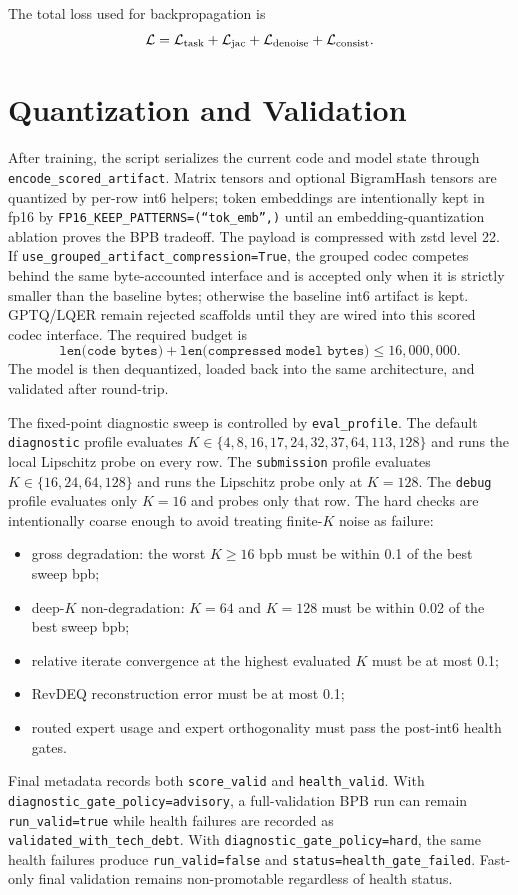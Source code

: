 \documentclass[11pt]{article}
\begin{document}
The total loss used for backpropagation is
\[
  \mathcal{L}
    = \mathcal{L}_{\rm task}
    + \mathcal{L}_{\rm jac}
    + \mathcal{L}_{\rm denoise}
    + \mathcal{L}_{\rm consist}.
\]

\section{Quantization and Validation}
\label{sec:validation}

After training, the script serializes the current code and model state through
\texttt{encode\_scored\_artifact}.  Matrix tensors and optional BigramHash
tensors are quantized by per-row int6 helpers; token embeddings are
intentionally kept in fp16 by
\texttt{FP16\_KEEP\_PATTERNS=(\textquotedblleft tok\_emb\textquotedblright,)}
until an embedding-quantization ablation proves the BPB tradeoff.  The payload
is compressed with zstd level 22.  If
\texttt{use\_grouped\_artifact\_compression=True}, the grouped codec competes
behind the same byte-accounted interface and is accepted only when it is
strictly smaller than the baseline bytes; otherwise the baseline int6 artifact
is kept.  GPTQ/LQER remain rejected scaffolds until they are wired into this
scored codec interface.  The required budget is
\[
  \texttt{len(code bytes)}+\texttt{len(compressed model bytes)}
  \le 16{,}000{,}000.
\]
The model is then dequantized, loaded back into the same architecture, and
validated after round-trip.

The fixed-point diagnostic sweep is controlled by \texttt{eval\_profile}.
The default \texttt{diagnostic} profile evaluates
$K\in\{4,8,16,17,24,32,37,64,113,128\}$ and runs the local Lipschitz probe on
every row.  The \texttt{submission} profile evaluates
$K\in\{16,24,64,128\}$ and runs the Lipschitz probe only at $K=128$.
The \texttt{debug} profile evaluates only $K=16$ and probes only that row.
The hard checks are intentionally coarse enough to avoid treating finite-$K$
noise as failure:
\begin{itemize}[leftmargin=2em,itemsep=0.2em]
  \item gross degradation: the worst $K\ge 16$ bpb must be within 0.1 of the
        best sweep bpb;
  \item deep-$K$ non-degradation: $K=64$ and $K=128$ must be within 0.02 of
        the best sweep bpb;
  \item relative iterate convergence at the highest evaluated $K$ must be
        at most 0.1;
  \item RevDEQ reconstruction error must be at most 0.1;
  \item routed expert usage and expert orthogonality must pass the post-int6
        health gates.
\end{itemize}
Final metadata records both \texttt{score\_valid} and \texttt{health\_valid}.
With \texttt{diagnostic\_gate\_policy=advisory}, a full-validation BPB run can
remain \texttt{run\_valid=true} while health failures are recorded as
\texttt{validated\_with\_tech\_debt}.  With
\texttt{diagnostic\_gate\_policy=hard}, the same health failures produce
\texttt{run\_valid=false} and \texttt{status=health\_gate\_failed}.  Fast-only
final validation remains non-promotable regardless of health status.
\end{document}
